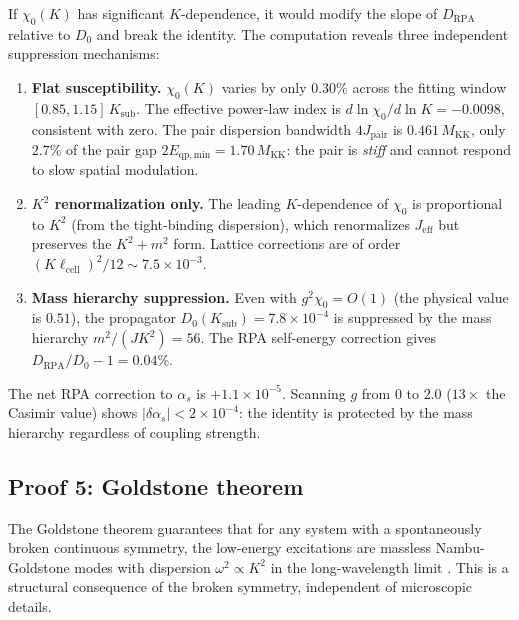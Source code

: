 \documentclass[12pt]{article}
\theoremstyle{definition}
\theoremstyle{remark}
\begin{document}
If $\chi_0(K)$ has significant $K$-dependence, it would modify the slope of $D_{\mathrm{RPA}}$ relative to $D_0$ and break the identity. The computation reveals three independent suppression mechanisms:

\begin{enumerate}
  \item {\sloppy \textbf{Flat susceptibility.} $\chi_0(K)$ varies by only $0.30\%$ across the fitting window $[0.85, 1.15]\,K_{\mathrm{sub}}$. The effective power-law index is $d\ln\chi_0/d\ln K = -0.0098$, consistent with zero. The pair dispersion bandwidth $4J_{\mathrm{pair}}$ is $0.461\,M_{\mathrm{KK}}$, only $2.7\%$ of the pair gap $2E_{\mathrm{qp,min}} = 1.70\,M_{\mathrm{KK}}$: the pair is \emph{stiff} and cannot respond to slow spatial modulation.\par}

  \item \textbf{$K^2$ renormalization only.} The leading $K$-dependence of $\chi_0$ is proportional to $K^2$ (from the tight-binding dispersion), which renormalizes $J_{\mathrm{eff}}$ but preserves the $K^2 + m^2$ form. Lattice corrections are of order $(K\ell_{\mathrm{cell}})^2/12 \sim 7.5 \times 10^{-3}$.

  \item \textbf{Mass hierarchy suppression.} Even with $g^2 \chi_0 = O(1)$ (the physical value is $0.51$), the propagator $D_0(K_{\mathrm{sub}}) = 7.8 \times 10^{-4}$ is suppressed by the mass hierarchy $m^2/(JK^2) = 56$. The RPA self-energy correction gives $D_{\mathrm{RPA}}/D_0 - 1 = 0.04\%$.
\end{enumerate}

The net RPA correction to $\alpha_s$ is $+1.1 \times 10^{-5}$. Scanning $g$ from $0$ to $2.0$ ($13\times$ the Casimir value) shows $|\delta\alpha_s| < 2 \times 10^{-4}$: the identity is protected by the mass hierarchy regardless of coupling strength.

\subsection{Proof 5: Goldstone theorem}\label{sec:proof5}

The Goldstone theorem guarantees that for any system with a spontaneously broken continuous symmetry, the low-energy excitations are massless Nambu-Goldstone modes with dispersion $\omega^2 \propto K^2$ in the long-wavelength limit \citep{WatanabeMurayama2012}. This is a structural consequence of the broken symmetry, independent of microscopic details.
\end{document}

